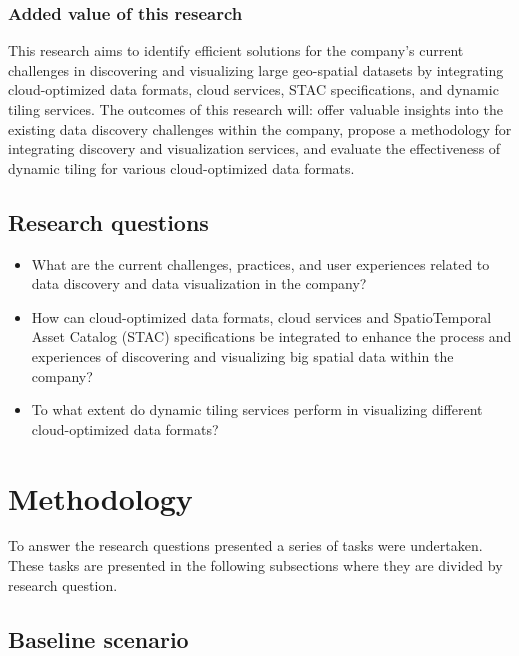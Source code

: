 \documentclass[
  oneside,
  open=any]{scrbook}
\providecommand{\tightlist}{%
  \setlength{\itemsep}{0pt}\setlength{\parskip}{0pt}}\usepackage{longtable,booktabs,array}
\begin{document}
\subsection{Added value of this
research}\label{added-value-of-this-research}

This research aims to identify efficient solutions for the company's
current challenges in discovering and visualizing large geo-spatial
datasets by integrating cloud-optimized data formats, cloud services,
STAC specifications, and dynamic tiling services. The outcomes of this
research will: offer valuable insights into the existing data discovery
challenges within the company, propose a methodology for integrating
discovery and visualization services, and evaluate the effectiveness of
dynamic tiling for various cloud-optimized data formats.

\section{Research questions}\label{research-questions}

\begin{itemize}
\tightlist
\item
  What are the current challenges, practices, and user experiences
  related to data discovery and data visualization in the company?
\item
  How can cloud-optimized data formats, cloud services and
  SpatioTemporal Asset Catalog (STAC) specifications be integrated to
  enhance the process and experiences of discovering and visualizing big
  spatial data within the company?
\item
  To what extent do dynamic tiling services perform in visualizing
  different cloud-optimized data formats?
\end{itemize}

\chapter{Methodology}\label{methodology}

To answer the research questions presented a series of tasks were
undertaken. These tasks are presented in the following subsections where
they are divided by research question.

\section{Baseline scenario}\label{sec-baseline}
\end{document}
